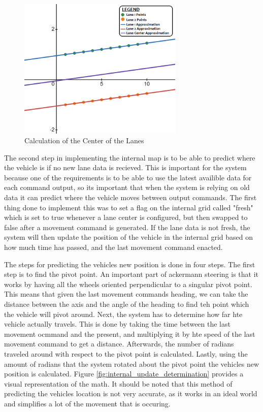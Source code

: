 \documentclass[titlepage]{article}
\begin{document}
{\begin{figure}
	\centering
	\includegraphics[width=0.7\textwidth]{lane_center}
	\caption{Calculation of the Center of the Lanes}
	\label{fig:lane_center_determination}
\end{figure}

The second step in implementing the internal map is to be able to predict where the vehicle is if no new lane data is recieved. This is important for the system because one of the requirements is to be able to use the latest availible data for each command output, so its important that when the system is relying on old data it can predict where the vehicle moves between output commands. The first thing done to implement this was to set a flag on the internal grid called "fresh" which is set to true whenever a lane center is configured, but then swapped to false after a movement command is generated. If the lane data is not fresh, the system will then update the position of the vehicle in the internal grid based on how much time has passed, and the last movement command enacted.

The steps for predicting the vehicles new position is done in four steps. The first step is to find the pivot point. An important part of ackermann steering is that it works by having all the wheels oriented perpendicular to a singular pivot point. This means that given the last movement commands heading, we can take the distance between the axis and the angle of the heading to find teh point which the vehicle will pivot around. Next, the system has to determine how far hte vehicle actually travels. This is done by taking the time between the last movement ocmmand and the present, and multiplying it by hte speed of the last movement command to get a distance. Afterwards, the number of radians traveled around with respect to the pivot point is calculated. Lastly, using the amount of radians that the system rotated about the pivot point the vehicles new position is calculated. Figure \ref{fig:internal_update_determination} provides a visual representation of the math. It should be noted that this method of predicting the vehicles location is not very accurate, as it works in an ideal world and simplifies a lot of the movement that is occuring.

}
\end{document}
